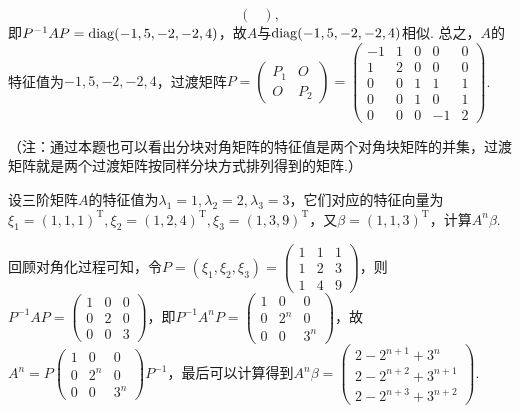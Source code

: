 \begin{exercise}
\begin{exgroup}
\begin{answer}
\[\begin{pmatrix}
            \end{pmatrix},\]
        即$P^{-1}AP=\operatorname{diag}(-1,5,-2,-2,4)$，故$A$与$\operatorname{diag}(-1,5,-2,-2,4)$相似. 总之，$A$的特征值为$-1,5,-2,-2,4$，过渡矩阵$P=\begin{pmatrix}
                P_1 & O \\ O & P_2
            \end{pmatrix}=\begin{pmatrix}
                -1 & 1 & 0 & 0 & 0 \\ 1 & 2 & 0 & 0 & 0 \\ 0 & 0 & 1 & 1 & 1 \\ 0 & 0 & 1 & 0 & 1 \\ 0 & 0 & 0 & -1 & 2
            \end{pmatrix}$.

        （注：通过本题也可以看出分块对角矩阵的特征值是两个对角块矩阵的并集，过渡矩阵就是两个过渡矩阵按同样分块方式排列得到的矩阵.）
        \end{answer}

        \item 设三阶矩阵$A$的特征值为$\lambda_1=1,\lambda_2=2,\lambda_3=3$，它们对应的特征向量为$\xi_1=(1,1,1)^\mathrm{T}, \xi_2=(1,2,4)^\mathrm{T},\xi_3=(1,3,9)^\mathrm{T}$，又$\beta=(1,1,3)^\mathrm{T}$，计算$A^n\beta$.
        \begin{answer}
            回顾对角化过程可知，令$P=(\xi_1,\xi_2,\xi_3)=\begin{pmatrix}
                1 & 1 & 1 \\ 1 & 2 & 3 \\ 1 & 4 & 9
            \end{pmatrix}$，则$P^{-1}AP=\begin{pmatrix}
                1 & 0 & 0 \\ 0 & 2 & 0 \\ 0 & 0 & 3
            \end{pmatrix}$，即$P^{-1}A^nP=\begin{pmatrix}
                1 & 0 & 0 \\ 0 & 2^n & 0 \\ 0 & 0 & 3^n
            \end{pmatrix}$，故$A^n=P\begin{pmatrix}
                1 & 0 & 0 \\ 0 & 2^n & 0 \\ 0 & 0 & 3^n
            \end{pmatrix}P^{-1}$，最后可以计算得到$A^n\beta=\begin{pmatrix}
                2-2^{n+1}+3^n \\ 2-2^{n+2}+3^{n+1} \\ 2-2^{n+3}+3^{n+2}
            \end{pmatrix}$.
        \end{answer}


\end{exgroup}
\end{exercise}
